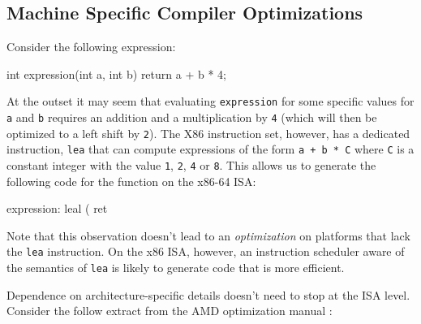 \subsection{Machine Specific Compiler Optimizations}

Consider the following expression:

\begin{ccode}
int expression(int a, int b) {
  return a + b * 4;
}
\end{ccode}

At the outset it may seem that evaluating \texttt{expression} for some
specific values for \texttt{a} and \texttt{b} requires an addition and
a multiplication by \texttt{4} (which will then be optimized to a left
shift by \texttt{2}).  The X86 instruction set, however, has a
dedicated instruction, \texttt{lea} that can compute expressions of
the form \texttt{a + b * C} where \texttt{C} is a constant integer
with the value \texttt{1}, \texttt{2}, \texttt{4} or \texttt{8}.  This
allows us to generate the following code for the function on the
x86-64 ISA:

\begin{gascode}
expression:
  leal (%
  ret
\end{gascode}

Note that this observation doesn't lead to an \textit{optimization} on
platforms that lack the \texttt{lea} instruction.  On the x86 ISA,
however, an instruction scheduler aware of the semantics of
\texttt{lea} is likely to generate code that is more efficient.

Dependence on architecture-specific details doesn't need to stop at
the ISA level.  Consider the follow extract from the AMD optimization
manual \cite[Section ~6.2]{amd64opt}:

